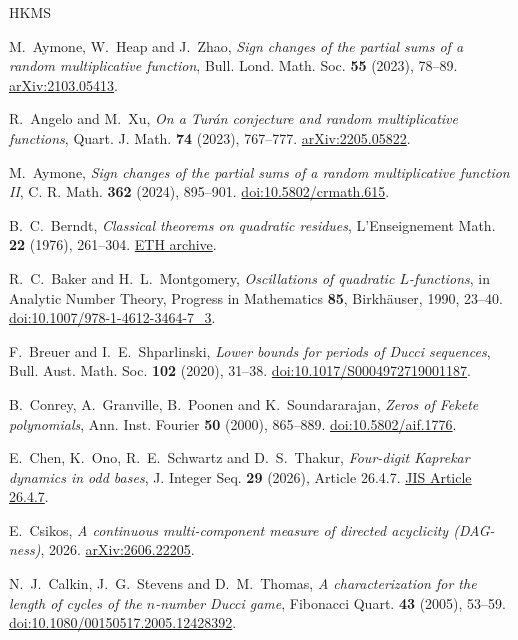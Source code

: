 \documentclass[11pt,reqno]{amsart}
\begin{document}
\begingroup\raggedright
\begin{thebibliography}{HKMS}

M.~Aymone, W.~Heap and J.~Zhao, \emph{Sign changes of the partial sums of a random multiplicative function},
Bull. Lond. Math. Soc. \textbf{55} (2023), 78--89.
\href{https://arxiv.org/abs/2103.05413}{arXiv:2103.05413}.

R.~Angelo and M.~Xu, \emph{On a Tur\'an conjecture and random multiplicative functions},
Quart. J. Math. \textbf{74} (2023), 767--777.
\href{https://arxiv.org/abs/2205.05822}{arXiv:2205.05822}.

M.~Aymone, \emph{Sign changes of the partial sums of a random multiplicative function II},
C. R. Math. \textbf{362} (2024), 895--901.
\href{https://doi.org/10.5802/crmath.615}{doi:10.5802/crmath.615}.

B.~C.~Berndt, \emph{Classical theorems on quadratic residues},
L'Enseignement Math. \textbf{22} (1976), 261--304.
\href{https://www.e-periodica.ch/cntmng?pid=ens-001\%3A1976\%3A22\%3A\%3A110}{ETH archive}.

R.~C.~Baker and H.~L.~Montgomery, \emph{Oscillations of quadratic \(L\)-functions},
in Analytic Number Theory, Progress in Mathematics \textbf{85}, Birkh\"auser, 1990, 23--40.
\href{https://doi.org/10.1007/978-1-4612-3464-7_3}{doi:10.1007/978-1-4612-3464-7\_3}.

F.~Breuer and I.~E.~Shparlinski, \emph{Lower bounds for periods of Ducci
sequences}, Bull. Aust. Math. Soc. \textbf{102} (2020), 31--38.
\href{https://doi.org/10.1017/S0004972719001187}{doi:10.1017/S0004972719001187}.

B.~Conrey, A.~Granville, B.~Poonen and K.~Soundararajan, \emph{Zeros of Fekete polynomials},
Ann. Inst. Fourier \textbf{50} (2000), 865--889.
\href{https://doi.org/10.5802/aif.1776}{doi:10.5802/aif.1776}.

E.~Chen, K.~Ono, R.~E.~Schwartz and D.~S.~Thakur,
\emph{Four-digit Kaprekar dynamics in odd bases},
J. Integer Seq. \textbf{29} (2026), Article 26.4.7.
\href{https://cs.uwaterloo.ca/journals/JIS/VOL29/Ono/ono3.pdf}{JIS Article 26.4.7}.

E.~Csikos, \emph{A continuous multi-component measure of directed acyclicity (DAG-ness)}, 2026.
\href{https://arxiv.org/abs/2606.22205}{arXiv:2606.22205}.

N.~J.~Calkin, J.~G.~Stevens and D.~M.~Thomas,
\emph{A characterization for the length of cycles of the \(n\)-number
Ducci game}, Fibonacci Quart. \textbf{43} (2005), 53--59.
\href{https://doi.org/10.1080/00150517.2005.12428392}{doi:10.1080/00150517.2005.12428392}.


\end{thebibliography}
\end{document}
